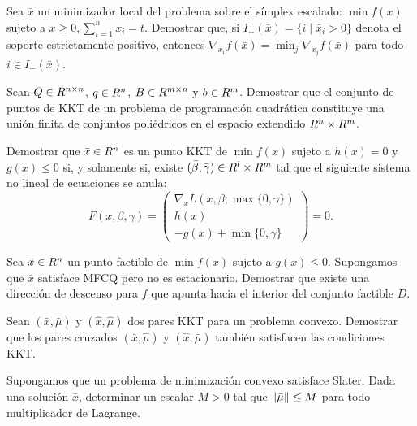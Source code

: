 \begin{exercise}\label{v1:ejer:4.2.7}
 Sea $\bar{x}$ un minimizador local del problema sobre el símplex escalado: $\min f(x)$ sujeto a $x \ge 0, \sum_{i=1}^n x_i = t$. Demostrar que, si $I_+(\bar{x}) = \{ i \mid \bar{x}_i > 0 \}$ denota el soporte estrictamente positivo, entonces $\nabla_{x_i} f(\bar{x}) = \min_{j} \nabla_{x_j} f(\bar{x})$ para todo $i \in I_+(\bar{x})$.
\end{exercise}

\begin{exercise}\label{v1:ejer:4.2.8}
 Sean $Q \in R^{n \times n}$, $q \in R^n$, $B \in R^{m \times n}$ y $b \in R^m$. Demostrar que el conjunto de puntos de KKT de un problema de programación cuadrática constituye una unión finita de conjuntos poliédricos en el espacio extendido $R^n \times R^m$.
\end{exercise}

\begin{exercise}\label{v1:ejer:4.2.9}
 Demostrar que $\bar{x} \in R^n$ es un punto KKT de $\min f(x)$ sujeto a $h(x) = 0$ y $g(x) \le 0$ si, y solamente si, existe $(\bar{\beta}, \bar{\gamma}) \in R^l \times R^m$ tal que el siguiente sistema no lineal de ecuaciones se anula:
 \[
 F(x, \beta, \gamma) = \begin{pmatrix} \nabla_x L(x, \beta, \max\{0, \gamma\}) \\ h(x) \\ -g(x) + \min\{0, \gamma\} \end{pmatrix} = 0.
 \]
\end{exercise}

\begin{exercise}\label{v1:ejer:4.2.10}
 Sea $\bar{x} \in R^n$ un punto factible de $\min f(x)$ sujeto a $g(x) \le 0$. Supongamos que $\bar{x}$ satisface MFCQ pero no es estacionario. Demostrar que existe una dirección de descenso para $f$ que apunta hacia el interior del conjunto factible $D$.
\end{exercise}

\begin{exercise}\label{v1:ejer:4.2.11}
 Sean $(\bar{x}, \bar{\mu})$ y $(\hat{x}, \hat{\mu})$ dos pares KKT para un problema convexo. Demostrar que los pares cruzados $(\bar{x}, \hat{\mu})$ y $(\hat{x}, \bar{\mu})$ también satisfacen las condiciones KKT.
\end{exercise}

\begin{exercise}\label{v1:ejer:4.2.12}
 Supongamos que un problema de minimización convexo satisface Slater. Dada una solución $\bar{x}$, determinar un escalar $M > 0$ tal que $\lVert\bar{\mu}\rVert \le M$ para todo multiplicador de Lagrange.
\end{exercise}

